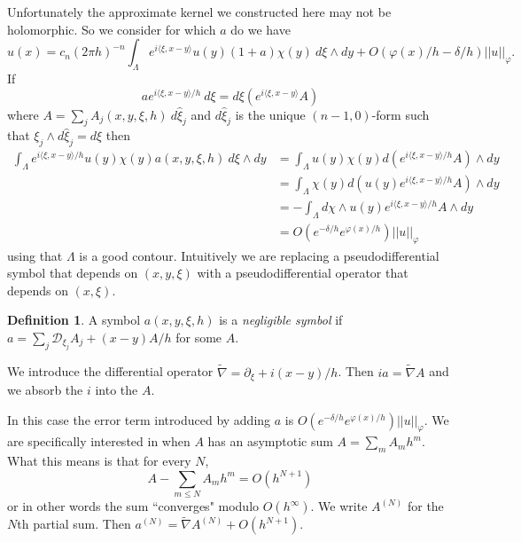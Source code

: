 \documentclass[12pt]{report}
\newcommand{\D}{\mathcal{D}}
\newcommand{\dfn}[1]{\emph{#1}\index{#1}}
\theoremstyle{definition}
\newtheorem{definition}[theorem]{Definition}
\begin{document}
    Unfortunately the approximate kernel we constructed here may not be holomorphic. So we consider for which $a$ do we have
    $$u(x) = c_n(2\pi h)^{-n} \int_\Lambda e^{i\langle \xi, x-y\rangle} u(y)(1+a)\chi(y) ~d\xi \wedge dy + O(\varphi(x)/h - \delta/h)||u||_\varphi.$$
    If
    $$ae^{i\langle \xi, x - y\rangle/h} ~d\xi = d\xi(e^{i\langle \xi ,x -y\rangle}A)$$
    where $A = \sum_j A_j(x, y, \xi, h) ~d\hat \xi_j$ and $d\hat \xi_j$ is the unique $(n-1,0)$-form such that $\xi_j \wedge d\hat \xi_j = d\xi$ then
\begin{align*}
    \int_\Lambda e^{i\langle \xi, x-y\rangle/h} u(y) \chi(y) a(x, y, \xi, h) ~d\xi\wedge dy &= \int_\Lambda u(y)\chi(y) d(e^{i\langle \xi, x-y\rangle/h}A) \wedge dy\\
    &= \int_\Lambda \chi(y)d(u(y)e^{i\langle \xi, x-y\rangle/h}A) \wedge dy\\
    &= -\int_\Lambda d\chi \wedge u(y)e^{i\langle \xi,x-y\rangle/h}A \wedge dy\\
    &= O(e^{-\delta/h}e^{\varphi(x)/h})||u||_\varphi
\end{align*}
    using that $\Lambda$ is a good contour. Intuitively we are replacing a pseudodifferential symbol that depends on $(x, y, \xi)$ with a pseudodifferential operator that depends on $(x, \xi)$.
\begin{definition}
    A symbol $a(x, y, \xi, h)$ is a \dfn{negligible symbol} if $a = \sum_j \D_{\xi_j}A_j + (x-y)A/h$ for some $A$.
\end{definition}
    We introduce the differential operator $\tilde \nabla = \partial_\xi + i(x - y)/h$. Then $ia = \tilde \nabla A$ and we absorb the $i$ into the $A$.

    In this case the error term introduced by adding $a$ is $O(e^{-\delta/h}e^{\varphi(x)/h})||u||_\varphi$. We are specifically interested in when $A$ has an asymptotic sum $A = \sum_m A_m h^m$. What this means is that for every $N$,
    $$A - \sum_{m\leq N} A_m h^m = O(h^{N+1})$$
    or in other words the sum ``converges" modulo $O(h^\infty)$. We write $A^{(N)}$ for the $N$th partial sum. Then $a^{(N)} = \tilde \nabla A^{(N)} + O(h^{N+1})$.
\end{document}
